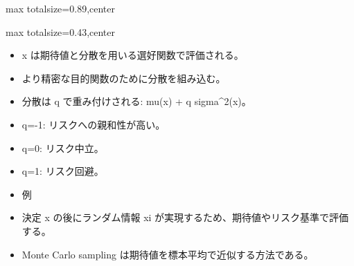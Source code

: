 \begin{minipage}[t]{0.58\textwidth}
\begin{adjustbox}{max totalsize={\textwidth}{0.89\textheight},center}
\begin{minipage}{\textwidth}
\end{minipage}
\end{adjustbox}
\end{minipage}


\clearpage
{}
\begin{minipage}[t]{0.405\textwidth}
\begin{adjustbox}{max totalsize={\textwidth}{0.43\textheight},center}
\begin{minipage}{\textwidth}\scriptsize
{}\begin{itemize}
\item x は期待値と分散を用いる選好関数で評価される。
\item より精密な目的関数のために分散を組み込む。
\item 分散は q で重み付けされる: mu(x) + q sigma\textasciicircum{}2(x)。
\item q=-1: リスクへの親和性が高い。
\item q=0: リスク中立。
\item q=1: リスク回避。
\item 例
\end{itemize}\begin{itemize}
\item 決定 x の後にランダム情報 xi が実現するため、期待値やリスク基準で評価する。
\item Monte Carlo sampling は期待値を標本平均で近似する方法である。
\end{itemize}
\end{minipage}
\end{adjustbox}
\end{minipage}\hfill

